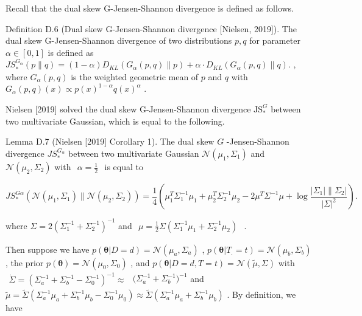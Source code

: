 Recall that the dual skew G-Jensen-Shannon divergence is defined as
follows.

Definition D.6 (Dual skew G-Jensen-Shannon divergence {[}Nielsen,
2019{]}). The dual skew G-Jensen-Shannon divergence of two distributions
\(p , q\) for parameter \(\alpha \in [ 0 , 1 ]\) is defined as
\(J S _ { * } ^ { G _ { \alpha } } ( p \| q ) = ( 1 - \alpha ) D _ { K L } ( G _ { \alpha } ( p , q ) \| p ) + \alpha \cdot D _ { K L } ( G _ { \alpha } ( p , q ) \| q ) .\)
, where \(G _ { \alpha } ( p , q )\) is the weighted geometric mean of
\(p\) and \(q\) with
\(G _ { \alpha } ( p , q ) ( x ) \propto p ( x ) ^ { 1 - \alpha } q ( x ) ^ { \alpha }\)
.

Nielsen {[}2019{]} solved the dual skew G-Jensen-Shannon divergence
\(\mathrm { J S } _ { \ast } ^ { G }\) between two multivariate
Gaussian, which is equal to the following.

Lemma D.7 (Nielsen {[}2019{]} Corollary 1). The dual skew \(G\)
-Jensen-Shannon divergence \(J S _ { * } ^ { G _ { \alpha } }\) between
two multivariate Gaussian
\(\mathcal { N } ( \mu _ { 1 } , \Sigma _ { 1 } )\) and
\(\mathcal { N } ( \mu _ { 2 } , \Sigma _ { 2 } )\) with
\(\begin{array} { r } { \alpha = \frac { 1 } { 2 } } \end{array}\) is
equal to

\[
J S _ { \ast } ^ { G \alpha } ( \mathcal { N } ( \mu _ { 1 } , \Sigma _ { 1 } ) \| \mathcal { N } ( \mu _ { 2 } , \Sigma _ { 2 } ) ) = \frac { 1 } { 4 } \left( \mu _ { 1 } ^ { T } \Sigma _ { 1 } ^ { - 1 } \mu _ { 1 } + \mu _ { 2 } ^ { T } \Sigma _ { 2 } ^ { - 1 } \mu _ { 2 } - 2 \mu ^ { T } \Sigma ^ { - 1 } \mu + \log \frac { | \Sigma _ { 1 } | \| \Sigma _ { 2 } | } { | \Sigma | ^ { 2 } } \right) .
\]

where
\(\Sigma = 2 ( \Sigma _ { 1 } ^ { - 1 } + \Sigma _ { 2 } ^ { - 1 } ) ^ { - 1 }\)
and
\(\begin{array} { r } { \mu = \frac { 1 } { 2 } \Sigma ( \Sigma _ { 1 } ^ { - 1 } \mu _ { 1 } + \Sigma _ { 2 } ^ { - 1 } \mu _ { 2 } ) } \end{array}\)
.

Then suppose we have
\(p ( \pmb \theta | D = d ) = \mathcal N ( \mu _ { a } , \Sigma _ { a } )\)
,
\(p ( \pmb \theta | T _ { . } = t ) = \mathcal { N } ( \mu _ { b } , \Sigma _ { b } )\)
, the prior
\(p ( \pmb \theta ) = \mathcal { N } ( \mu _ { 0 } , \Sigma _ { 0 } )\)
, and
\(p ( \pmb \theta | D = d , T = t ) = \mathcal N ( \widetilde \mu , \Sigma )\)
with
\(\begin{array} { r } { \dot { \Sigma } = ( \Sigma _ { a } ^ { - 1 } + \Sigma _ { b } ^ { - 1 } - \Sigma _ { 0 } ^ { - 1 } ) ^ { - 1 } \approx } \end{array}\)
\(\big ( \Sigma _ { a } ^ { - 1 } + \Sigma _ { b } ^ { - 1 } \big ) ^ { - 1 }\)
and
\(\widetilde { \mu } = \widetilde \Sigma \left( \Sigma _ { a } ^ { - 1 } \mu _ { a } + \Sigma _ { b } ^ { - 1 } \mu _ { b } - \Sigma _ { 0 } ^ { - 1 } \mu _ { 0 } \right) \approx \widetilde \Sigma \left( \Sigma _ { a } ^ { - 1 } \mu _ { a } + \Sigma _ { b } ^ { - 1 } \mu _ { b } \right)\)
. By definition, we have

